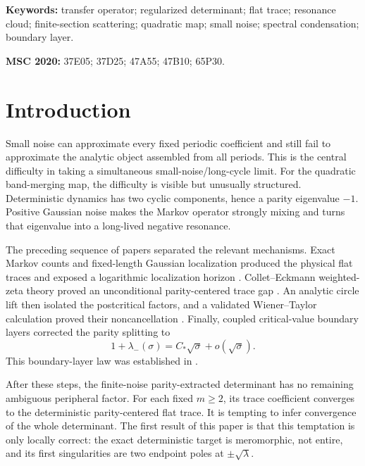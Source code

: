 \documentclass[11pt]{article}
\theoremstyle{definition}
\theoremstyle{remark}
\begin{document}
\noindent\textbf{Keywords:} transfer operator; regularized determinant;
flat trace; resonance cloud; finite-section scattering; quadratic map;
small noise; spectral condensation; boundary layer.

\medskip
\noindent\textbf{MSC 2020:} 37E05; 37D25; 47A55; 47B10; 65P30.

\section{Introduction}
\label{sec:introduction}

Small noise can approximate every fixed periodic coefficient and still fail
to approximate the analytic object assembled from all periods.  This is the
central difficulty in taking a simultaneous small-noise/long-cycle limit.
For the quadratic band-merging map, the difficulty is visible but unusually
structured.  Deterministic dynamics has two cyclic components, hence a
parity eigenvalue $-1$.  Positive Gaussian noise makes the Markov operator
strongly mixing and turns that eigenvalue into a long-lived negative
resonance.

The preceding sequence of papers separated the relevant mechanisms.  Exact
Markov counts and fixed-length Gaussian localization produced the physical
flat traces and exposed a logarithmic localization horizon
\citep{WangLongCycle2026}.  Collet--Eckmann weighted-zeta theory proved an
unconditional parity-centered trace gap \citep{WangFlatTrace2026}.  An
analytic circle lift then isolated the postcritical factors, and a validated
Wiener--Taylor calculation proved their noncancellation
\citep{WangPostcritical2026,WangValidatedGap2026}.  Finally, coupled
critical-value boundary layers corrected the parity splitting to
\begin{equation}\label{eq:parity-law-intro}
 1+\lambda_-(\sigma)
 =C_*\sqrt\sigma+o(\sqrt\sigma).
\end{equation}
This boundary-layer law was established in \citet{WangBoundaryLayer2026}.

After these steps, the finite-noise parity-extracted determinant has no
remaining ambiguous peripheral factor.  For each fixed $m\ge2$, its trace
coefficient converges to the deterministic parity-centered flat trace.  It
is tempting to infer convergence of the whole determinant.  The first result
of this paper is that this temptation is only locally correct: the exact
deterministic target is meromorphic, not entire, and its first singularities
are two endpoint poles at $\pm\sqrt\lambda$.
\end{document}
